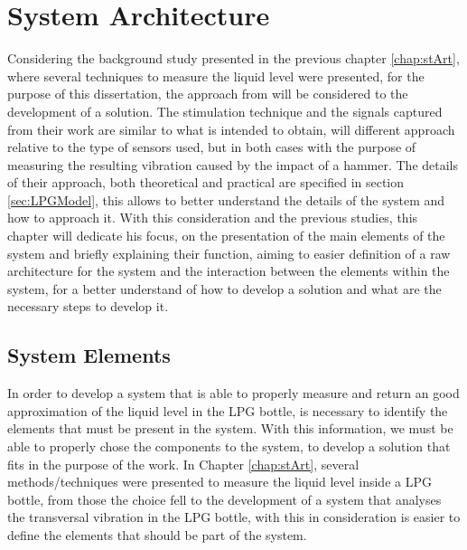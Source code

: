 \cleardoublepage
\chapter{System Architecture} \label{chap:sysArch}

Considering the background study presented in the previous chapter \ref{chap:stArt}, where several techniques to measure the liquid level were presented, for the purpose of this dissertation, the approach from \citeauthor{wuAnalysisImplementationNoncontact2016a} will be considered to the development of a solution. The stimulation technique and the signals captured from their work are similar to what is intended to obtain, will different approach relative to the type of sensors used, but in both cases with the purpose of measuring the resulting vibration caused by the impact of a hammer. The details of their approach, both theoretical and practical are specified in section \ref{sec:LPGModel}, this allows to better understand the details of the system and how to approach it. With this consideration and the previous studies, this chapter will dedicate his focus, on the presentation of the main elements of the system and briefly explaining their function, aiming to easier definition of a raw architecture for the system and the interaction between the elements within the system, for a better understand of how to develop a solution and what are the necessary steps to develop it.

\section{System Elements}
In order to develop a system that is able to properly measure and return an good approximation of the liquid level in the LPG bottle, is necessary to identify the elements that must be present in the system. With this information, we must be able to properly chose the components to the system, to develop a solution that fits in the purpose of the work. In Chapter \ref{chap:stArt}, several methods/techniques were presented to measure the liquid level inside a LPG bottle, from those the choice fell to the development of a system that analyses the transversal vibration in the LPG bottle, with this in consideration is easier to define the elements that should be part of the system. 
